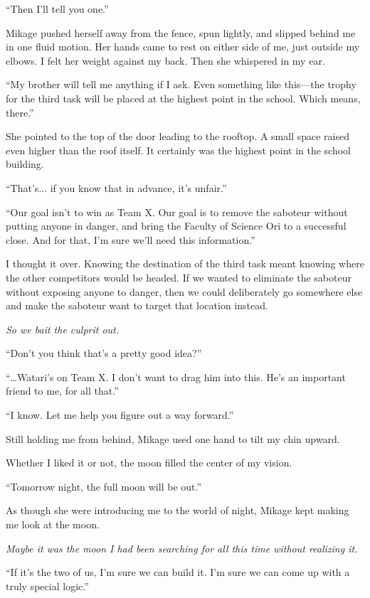 \documentclass[
    a4paper,
    12pt,
    twoside,
    openany,
    UTF8,
    fontset=windows
]{ctexbook}
\begin{document}
``Then I'll tell you one.''

Mikage pushed herself away from the fence, spun lightly, and slipped behind me in one fluid motion. Her hands came to rest on either side of me, just outside my elbows. I felt her weight against my back. Then she whispered in my ear.

``My brother will tell me anything if I ask. Even something like this---the trophy for the third task will be placed at the highest point in the school. Which means, there.''

She pointed to the top of the door leading to the rooftop. A small space raised even higher than the roof itself. It certainly was the highest point in the school building.

``That's... if you know that in advance, it's unfair.''

``Our goal isn't to win as Team X. Our goal is to remove the saboteur without putting anyone in danger, and bring the Faculty of Science Ori to a successful close. And for that, I'm sure we'll need this information.''

I thought it over. Knowing the destination of the third task meant knowing where the other competitors would be headed. If we wanted to eliminate the saboteur without exposing anyone to danger, then we could deliberately go somewhere else and make the saboteur want to target that location instead.

\textit{So we bait the culprit out.}

``Don't you think that's a pretty good idea?''

``\dots Watari's on Team X. I don't want to drag him into this. He's an important friend to me, for all that.''

``I know. Let me help you figure out a way forward.''

Still holding me from behind, Mikage used one hand to tilt my chin upward.

Whether I liked it or not, the moon filled the center of my vision.

``Tomorrow night, the full moon will be out.''

As though she were introducing me to the world of night, Mikage kept making me look at the moon.

\textit{Maybe it was the moon I had been searching for all this time without realizing it.}

``If it's the two of us, I'm sure we can build it. I'm sure we can come up with a truly special logic.''
\end{document}
